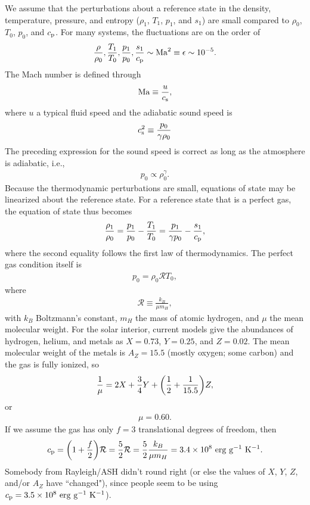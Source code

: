\documentclass[12pt]{article} %
\newcommand{\cp}{c_{\rm{p}}}
\begin{document}
	We assume that the perturbations about a reference state in the density, temperature, pressure, and entropy ($\rho_1$, $T_1$, $p_1$, and $s_1$) are small compared to $\rho_0$, $T_0$, $p_0$, and ${\cp}$. For many systems, the fluctuations are on the order of 
	\begin{align}
	\frac{\rho}{\rho_0}, \frac{T_1}{T_0}, \frac{p_1}{p_0},
	\frac{s_1}{{\cp}} \sim \rm{Ma}^2 \equiv \epsilon \sim 10^{-5}.
	\label{eq:smallthermopert}
	\end{align}
	The Mach number is defined through
	\begin{align}
	{\rm{Ma}} \equiv \frac{u}{c_{\rm{s}}},
	\end{align}
	where $u$ a typical fluid speed and the adiabatic sound speed is
	\begin{align}
	c_{\rm{s}}^2 \equiv \frac{p_0}{\gamma \rho_0}
	\end{align}
	The preceding expression for the sound speed is correct as long as the atmosphere is adiabatic, i.e.,
	\begin{align}
	p_0\propto\rho_0^\gamma.
	\end{align}
	Because the thermodynamic perturbations are small, equations of state may be linearized about the reference state. For a reference state that is a perfect gas, the equation of state thus becomes
	\begin{align}
	\frac{\rho_1}{\rho_0} = \frac{p_1}{p_0} - \frac{T_1}{T_0} = \frac{p_1}{\gamma p_0} - \frac{s_1}{{\cp}},
	\end{align}
	where the second equality follows the first law of thermodynamics. The perfect gas condition itself is
	\begin{align}
	p_0 = \rho_0\mathcal{R}T_0,
	\end{align}
	where 
	\begin{align}
	\mathcal{R} \equiv \frac{k_B}{\mu m_H},
	\end{align}
	with $k_B$ Boltzmann's constant, $m_H$ the mass of atomic hydrogen, and $\mu$ the mean molecular weight. For the solar interior, current models give the abundances of hydrogen, helium, and metals as $X=0.73$, $Y=0.25$, and $Z=0.02$. The mean molecular weight of the metals is $A_Z=15.5$ (mostly oxygen; some carbon) and the gas is fully ionized, so
	\begin{align}
	\frac{1}{\mu}=2X + \frac{3}{4}Y+\bigg{(}\frac{1}{2}+\frac{1}{15.5}\bigg{)}Z,
	\end{align}
	or
	\begin{align}
	\mu=0.60.
	\end{align}
	If we assume the gas has only $f=3$ translational degrees of freedom, then
	\begin{align}
	{\cp} =\bigg{(}1+\frac{f}{2}\bigg{)}\mathcal{R}= \frac{5}{2}\mathcal{R} = \frac{5}{2}\frac{k_B}{\mu m_H} = 3.4\times 10^8\ \rm{erg}\ \rm{g}^{-1}\ \rm{K}^{-1}.
	\end{align}
	Somebody from Rayleigh/ASH didn't round right (or else the values of $X$, $Y$, $Z$, and/or $A_Z$ have ``changed"), since people seem to be using ${\cp}=3.5\times 10^8\ \rm{erg}\ \rm{g}^{-1}\ \rm{K}^{-1}$). 
	
\end{document}
